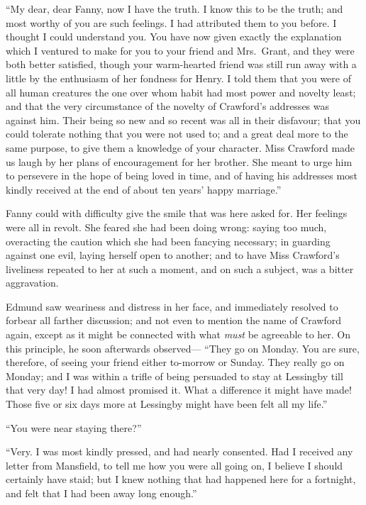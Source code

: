 \documentclass{article}
\begin{document}
``My dear, dear Fanny, now I have the truth.  I know this
to be the truth; and most worthy of you are such feelings.
I had attributed them to you before.  I thought I could
understand you.  You have now given exactly the explanation
which I ventured to make for you to your friend and Mrs.\ Grant,
and they were both better satisfied, though your warm-hearted
friend was still run away with a little by the enthusiasm
of her fondness for Henry.  I told them that you were
of all human creatures the one over whom habit had most
power and novelty least; and that the very circumstance
of the novelty of Crawford's addresses was against him.
Their being so new and so recent was all in their disfavour;
that you could tolerate nothing that you were not used to;
and a great deal more to the same purpose, to give them
a knowledge of your character.  Miss Crawford made us
laugh by her plans of encouragement for her brother.
She meant to urge him to persevere in the hope of being
loved in time, and of having his addresses most kindly
received at the end of about ten years' happy marriage.''

Fanny could with difficulty give the smile that was
here asked for.  Her feelings were all in revolt.
She feared she had been doing wrong:  saying too much,
overacting the caution which she had been fancying necessary;
in guarding against one evil, laying herself open
to another; and to have Miss Crawford's liveliness
repeated to her at such a moment, and on such a subject,
was a bitter aggravation.

Edmund saw weariness and distress in her face,
and immediately resolved to forbear all farther discussion;
and not even to mention the name of Crawford again,
except as it might be connected with what \emph{must} be agreeable
to her.  On this principle, he soon afterwards observed---%
``They go on Monday.  You are sure, therefore, of seeing
your friend either to-morrow or Sunday.  They really go
on Monday; and I was within a trifle of being persuaded
to stay at Lessingby till that very day!  I had almost
promised it.  What a difference it might have made!
Those five or six days more at Lessingby might have been
felt all my life.''

``You were near staying there?''

``Very.  I was most kindly pressed, and had nearly consented.
Had I received any letter from Mansfield, to tell me how you
were all going on, I believe I should certainly have staid;
but I knew nothing that had happened here for a fortnight,
and felt that I had been away long enough.''
\end{document}
